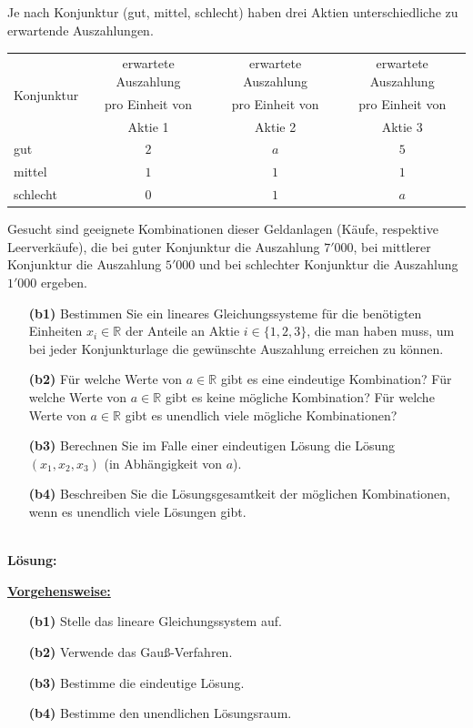 \subsection*{}
Je nach Konjunktur (gut, mittel, schlecht) haben drei Aktien unterschiedliche zu erwartende Auszahlungen.
\begin{table}[H]
	\centering
	\begin{tabular}{|l |c |c |c|}
		\hline
		\multirow{3}{*}{Konjunktur}
		& erwartete Auszahlung	& erwartete Auszahlung & erwartete Auszahlung\\
		& pro Einheit von & pro Einheit von & pro Einheit von\\
		& Aktie 1 & Aktie 2	& Aktie 3\\
		\hline
		gut & $ 2 $  &  $ a $ &  $ 5 $ \\ 
		\hline
		mittel & $ 1 $ & $ 1 $ & $ 1 $  \\ 
		\hline
		schlecht & $ 0 $ & $ 1 $ & $ a $ \\
		\hline
	\end{tabular}%
\end{table}
Gesucht sind geeignete Kombinationen dieser Geldanlagen (Käufe, respektive Leerverkäufe), die bei guter Konjunktur die Auszahlung $ 7'000 $, bei mittlerer Konjunktur die Auszahlung $ 5'000 $ und bei schlechter Konjunktur die Auszahlung $ 1'000 $ ergeben.
\begin{enumerate}
	\item[\textbf{(b1)}]
	Bestimmen Sie ein lineares Gleichungssysteme für die benötigten Einheiten $ x_i \in \mathbb{R} $ der Anteile an Aktie $ i \in \{1,2,3\} $, die man haben muss, um bei jeder Konjunkturlage die gewünschte Auszahlung erreichen zu können.
	\item[\textbf{(b2)}] 
	Für welche Werte von $ a \in \mathbb{R} $ gibt es eine eindeutige Kombination?
	Für welche Werte von $ a \in \mathbb{R} $ gibt es keine mögliche Kombination?
	Für welche Werte von $ a \in \mathbb{R} $ gibt es unendlich viele mögliche Kombinationen?
	\item[\textbf{(b3)}]
	Berechnen Sie im Falle einer eindeutigen Lösung die Lösung $ (x_1,x_2,x_3) $ (in Abhängigkeit von $ a $).
	\item[\textbf{(b4)}]
	Beschreiben Sie die Lösungsgesamtkeit der möglichen Kombinationen, wenn es unendlich viele Lösungen gibt.
\end{enumerate}
\ \\
\textbf{Lösung:}
\begin{mdframed}
\underline{\textbf{Vorgehensweise:}}
\renewcommand{\labelenumi}{\theenumi.}
\begin{enumerate}
\item[\textbf{(b1)}] Stelle das lineare Gleichungssystem auf.
\item[\textbf{(b2)}] Verwende das Gauß-Verfahren.
\item[\textbf{(b3)}] Bestimme die eindeutige Lösung.
\item[\textbf{(b4)}] Bestimme den unendlichen Lösungsraum.
\end{enumerate}
\end{mdframed}

